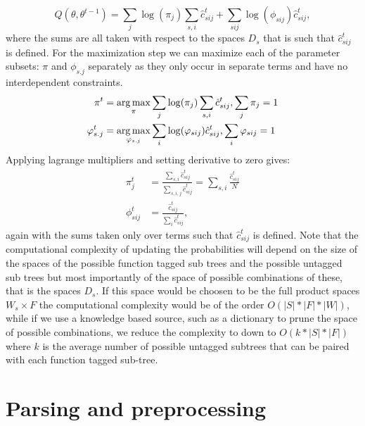 \begin{equation*}
Q(\theta,\theta^{t-1})=\sum_j\log(\pi_j)\sum_{s,i}\hat c^t_{sij} + \sum_{sij}\log(\phi_{sij})\hat c^t_{sij},
\end{equation*}
where the sums are all taken with respect to the spaces $D_s$ that is such that $\hat c^{t}_{sij}$ is defined.
For the maximization step we can maximize each of the parameter subsets: $\pi$ and $\phi_{s.j}$ separately as they only occur in separate terms and have no interdependent constraints.
\begin{equation*}
\begin{split}
\pi^t &= \operatorname*{arg\,max}_{\pi}
\sum_j\log(\pi_j)\sum_{s,i}\hat c^t_{sij}, \sum_j\pi_j = 1\\
\varphi_{s.j}^t &= \operatorname*{arg\,max}_{\varphi_{s.j}} \sum_i
\log(\varphi_{sij})\hat c^t_{sij}, \sum_i \varphi_{sij} = 1
\end{split}
\end{equation*}
Applying lagrange multipliers and setting derivative to zero gives:
\begin{equation*}
\begin{split}
\pi^t_j &= \frac{\sum_{s,i}\hat c^t_{sij}}
{\sum_{s,i,j} \hat c^t_{sij}}
= \sum_{s,i}\frac{\hat c^t_{sij}}
{N}\\
\phi_{sij}^t &= 
\frac{\hat c^t_{sij}}
{\sum_{i} \hat c^t_{sij}},
\end{split}
\end{equation*}
again with the sums taken only over terms such that $\hat c^t_{sij}$ is defined.
Note that the computational complexity of updating the probabilities will depend on the size of the spaces of the possible function tagged sub trees and the possible untagged sub trees but most importantly of the space of possible combinations of these, that is the spaces $D_s$. If this space would be choosen to be the full product spaces $W_s \times F$ the computational complexity would be of the order $O(|S|*|F|*|W|)$, while if we use a knowledge based source, such as a dictionary to prune the space of possible combinations, we reduce the complexity to down to $O(k*|S|*|F|)$ where $k$ is the average number of possible untagged subtrees that can be paired with each function tagged sub-tree.

\section{Parsing and preprocessing}